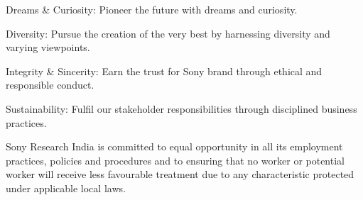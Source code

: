 Dreams & Curiosity: Pioneer the future with dreams and curiosity.

Diversity: Pursue the creation of the very best by harnessing diversity and varying viewpoints.

Integrity & Sincerity: Earn the trust for Sony brand through ethical and responsible conduct.

Sustainability: Fulfil our stakeholder responsibilities through disciplined business practices.



Sony Research India is committed to equal opportunity in all its employment practices, policies and procedures and to ensuring that no worker or potential worker will receive less favourable treatment due to any characteristic protected under applicable local laws.

